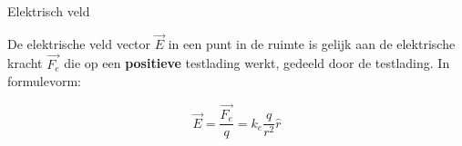 \begin{theo}{Elektrisch veld}

    De elektrische veld vector $ \Vec{E} $ in een punt in de ruimte is gelijk aan de elektrische kracht $ \Vec{F_e} $ die op een \textbf{positieve} testlading werkt, gedeeld door de testlading. In formulevorm:
    
    \begin{equation*}
        \Vec{E} = \dfrac{\Vec{F_e}}{q} =  k_e\dfrac{q}{r^2}\hat{r}
    \end{equation*}
    
    
    

\end{theo}

\newpage

